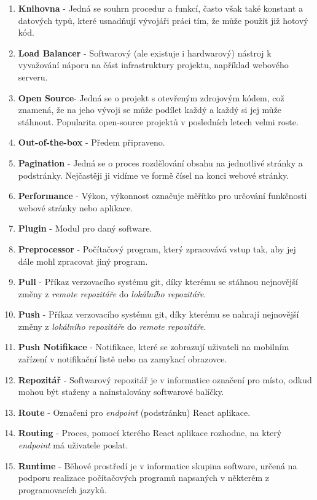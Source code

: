 \documentclass[12pt,a4paper]{report}
\begin{document}
\begin{enumerate}
    \item \textbf{Knihovna} - Jedná se souhrn procedur a funkcí, často však také konstant a datových typů, které usnadňují vývojáři práci tím, že může použít již hotový kód.
    \item \textbf{Load Balancer} - Softwarový (ale existuje i hardwarový) nástroj k vyvažování náporu na část infrastruktury projektu, například webového serveru.
    \item \textbf{Open Source}- Jedná se o projekt s otevřeným zdrojovým kódem, což znamená, že na jeho vývoji se může podílet každý a každý si jej může stáhnout. Popularita open-source projektů v posledních letech velmi roste.
    \item \textbf{Out-of-the-box} - Předem připraveno. 
    \item \textbf{Pagination} - Jedná se o proces rozdělování obsahu na jednotlivé stránky a podstránky. Nejčastěji ji vidíme ve formě čísel na konci webové stránky.
    \item \textbf{Performance} - Výkon, výkonnost označuje měřítko pro určování funkčnosti webové stránky nebo aplikace.
    \item \textbf{Plugin} - Modul pro daný software.
    \item \textbf{Preprocessor} - Počítačový program, který zpracovává vstup tak, aby jej dále mohl zpracovat jiný program.
    \item \textbf{Pull} - Příkaz verzovacího systému git, díky kterému se stáhnou nejnovější změny z \emph{remote repozitáře} do \emph{lokálního repozitáře}.
    \item \textbf{Push} - Příkaz verzovacího systému git, díky kterému se nahrají nejnovější změny z \emph{lokálního repozitáře} do \emph{remote repozitáře}.
    \item \textbf{Push Notifikace}  - Notifikace, které se zobrazují uživateli na mobilním zařízení v notifikační listě nebo na zamykací obrazovce.
    \item \textbf{Repozitář} - Softwarový repozitář je v informatice označení pro místo, odkud mohou být staženy a nainstalovány softwarové balíčky.
    \item \textbf{Route} - Označení pro \emph{endpoint} (podstránku) React aplikace.
    \item \textbf{Routing} - Proces, pomocí kterého React aplikace rozhodne, na který \emph{endpoint} má uživatele poslat.
    \item \textbf{Runtime} - Běhové prostředí je v informatice skupina software, určená na podporu realizace počítačových programů napsaných v některém z programovacích jazyků.

\end{enumerate}
\end{document}
